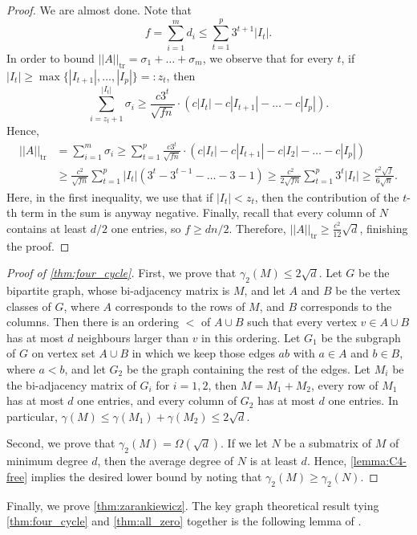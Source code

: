 \documentclass[11pt]{amsart}
\theoremstyle{plain}
\theoremstyle{definition}
\DeclareMathOperator{\tr}{tr}
\begin{document}
\begin{proof}
We are almost done. Note that 
$$f=\sum_{i=1}^md_i\leq \sum_{t=1}^p 3^{t+1}|I_t|.$$
In order to bound $||A||_{\tr}=\sigma_1+\dots+\sigma_m$, we observe that for every $t$, if $|I_t|\geq \max\{|I_{t+1}|,\dots,|I_p|\}=:z_t$, then $$\sum_{i=z_t+1}^{|I_t|}\sigma_i\geq \frac{c3^t}{\sqrt{fn}}\cdot (c|I_t|-c|I_{t+1}|-\dots-c|I_p|).$$ Hence, 
\begin{align*}
||A||_{\tr}&=\sum_{i=1}^m \sigma_i\geq \sum_{t=1}^p \frac{c3^t}{\sqrt{fn}}\cdot (c|I_t|-c|I_{t+1}|-c|I_2|-\dots-c|I_{p}|)\\
&\geq \frac{c^2}{\sqrt{fn}}\sum_{t=1}^p |I_t|(3^t-3^{t-1}-\dots-3-1) \geq \frac{c^2}{2\sqrt{fn}}\sum_{t=1}^p3^t |I_t|\geq \frac{c^2\sqrt{f}}{6\sqrt{n}}.
\end{align*}
Here, in the first inequality, we use that if $|I_t|< z_t$, then the contribution of the $t$-th term in the sum is anyway negative. Finally, recall that every column of $N$ contains at least $d/2$ one entries, so $f\geq dn/2$. Therefore, $||A||_{\tr}\geq \frac{c^2}{12}\sqrt{d}$, finishing the proof.
\end{proof}

\begin{proof}[Proof of \cref{thm:four_cycle}]
First, we prove that  $\gamma_2(M)\leq 2\sqrt{d}$. Let $G$ be the bipartite graph, whose bi-adjacency matrix is $M$, and let $A$ and $B$ be the vertex classes of $G$, where $A$ corresponds to the rows of $M$, and $B$ corresponds to the columns. Then there is an ordering $<$ of $A\cup B$ such that every vertex $v\in A\cup B$ has at most $d$ neighbours larger than $v$ in this ordering. Let $G_1$ be the subgraph of $G$ on vertex set $A\cup B$ in which we keep those edges $ab$ with $a\in A$ and $b\in B$, where $a<b$, and let $G_2$ be the graph containing the rest of the edges. Let $M_i$ be the bi-adjacency matrix of $G_i$ for $i=1,2$, then $M=M_1+M_2$, every row of $M_1$ has at most $d$ one entries, and every column of $G_2$ has at most $d$ one entries. In particular, $\gamma(M)\leq \gamma(M_1)+\gamma(M_2)\leq 2\sqrt{d}$.

Second, we prove that $\gamma_2(M)=\Omega(\sqrt{d})$. If we let $N$ be a submatrix of $M$ of minimum degree $d$, then the average degree of $N$ is at least $d$. Hence, \cref{lemma:C4-free} implies the desired lower bound by noting that $\gamma_2(M)\geq \gamma_2(N)$. 
\end{proof}

Finally, we prove \cref{thm:zarankiewicz}. The key graph theoretical result tying \cref{thm:four_cycle} and \cref{thm:all_zero} together is the following lemma of \cite{HMST0}.
\end{document}

